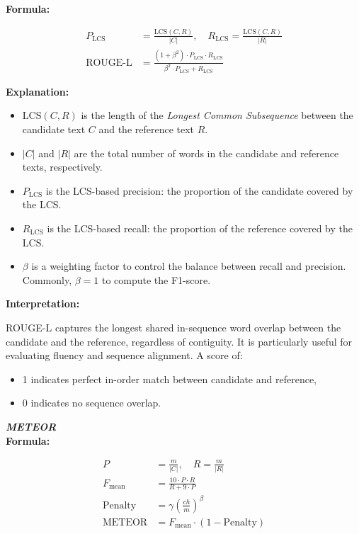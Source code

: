 \documentclass[conference]{IEEEtran}
\begin{document}
\textbf{Formula:}

\begin{align}
P_{\text{LCS}} &= \frac{\text{LCS}(C, R)}{|C|}, \quad
R_{\text{LCS}} = \frac{\text{LCS}(C, R)}{|R|} \\
\text{ROUGE-L} &= \frac{(1 + \beta^2) \cdot P_{\text{LCS}} \cdot R_{\text{LCS}}}{\beta^2 \cdot P_{\text{LCS}} + R_{\text{LCS}}}
\end{align}

\textbf{Explanation:}
\begin{itemize}
  \item $\text{LCS}(C, R)$ is the length of the \textit{Longest Common Subsequence} between the candidate text $C$ and the reference text $R$.
  \item $|C|$ and $|R|$ are the total number of words in the candidate and reference texts, respectively.
  \item $P_{\text{LCS}}$ is the LCS-based precision: the proportion of the candidate covered by the LCS.
  \item $R_{\text{LCS}}$ is the LCS-based recall: the proportion of the reference covered by the LCS.
  \item $\beta$ is a weighting factor to control the balance between recall and precision. Commonly, $\beta = 1$ to compute the F1-score.
\end{itemize}

\textbf{Interpretation:}

ROUGE-L captures the longest shared in-sequence word overlap between the candidate and the reference, regardless of contiguity. It is particularly useful for evaluating fluency and sequence alignment. A score of:
\begin{itemize}
  \item 1 indicates perfect in-order match between candidate and reference,
  \item 0 indicates no sequence overlap.
\end{itemize}
\vspace{1em}
\noindent \textbf{\textit{METEOR}}\\

\textbf{Formula:}

\begin{align}
P &= \frac{m}{|C|}, \quad R = \frac{m}{|R|} \\
F_{\text{mean}} &= \frac{10 \cdot P \cdot R}{R + 9 \cdot P} \\
\text{Penalty} &= \gamma \left( \frac{ch}{m} \right)^\beta \\
\text{METEOR} &= F_{\text{mean}} \cdot (1 - \text{Penalty})
\end{align}
\end{document}
